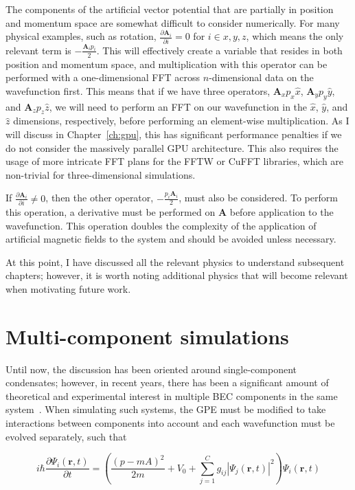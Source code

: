 The components of the artificial vector potential that are partially in position and momentum space are somewhat difficult to consider numerically.
For many physical examples, such as rotation, $\frac{\partial \mathbf{A}_i}{\partial i} = 0$ for $i \in {x, y, z}$, which means the only relevant term is $-\frac{\mathbf{A}_i p_i}{2}$.
This will effectively create a variable that resides in both position and momentum space, and multiplication with this operator can be performed with a one-dimensional FFT across $n$-dimensional data on the wavefunction first.
This means that if we have three operators, $\mathbf{A}_x p_x\hat x$, $\mathbf{A}_y p_y\hat y$, and $\mathbf{A}_z p_z\hat z$, we will need to perform an FFT on our wavefunction in the $\hat x$, $\hat y$, and $\hat z$ dimensions, respectively, before performing an element-wise multiplication. 
As I will discuss in Chapter~\ref{ch:gpu}, this has significant performance penalties if we do not consider the massively parallel GPU architecture.
This also requires the usage of more intricate FFT plans for the FFTW or CuFFT libraries, which are non-trivial for three-dimensional simulations.

If $\frac{\partial \mathbf{A}_i}{\partial i} \neq 0$, then the other operator, $-\frac{p_i\mathbf{A}_i}{2}$, must also be considered.
To perform this operation, a derivative must be performed on $\mathbf{A}$ before application to the wavefunction. 
This operation doubles the complexity of the application of artificial magnetic fields to the system and should be avoided unless necessary.

At this point, I have discussed all the relevant physics to understand subsequent chapters; however, it is worth noting additional physics that will become relevant when motivating future work.

\section{Multi-component simulations}

Until now, the discussion has been oriented around single-component condensates; however, in recent years, there has been a significant amount of theoretical and experimental interest in multiple BEC components in the same system~\cite{kasamatsu2005, bao2004, mason2013}.
When simulating such systems, the GPE must be modified to take interactions between components into account and each wavefunction must be evolved separately, such that 

\begin{equation}
i \hbar \frac{\partial \Psi_i(\mathbf{r},t)}{\partial t} = \left(\frac{(p-mA)^2}{2m} + V_0 + \sum_{j=1}^C g_{ij}|\Psi_j(\mathbf{r},t)|^2 \right)\Psi_i(\mathbf{r},t)
\label{eqn:GPE}
\end{equation}

